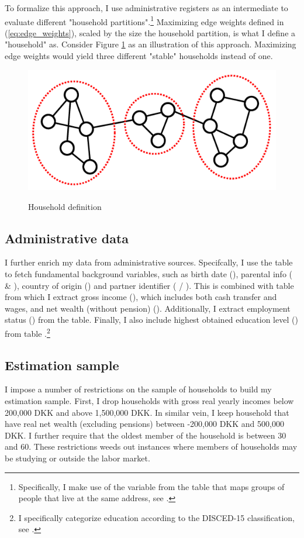 \documentclass[main.tex]{subfiles}
\begin{document}
To formalize this approach, I use administrative registers as an intermediate to evaluate different "household partitions".\footnote{Specifically, I make use of the  variable from the  table that maps groups of people that live at the same address, see \textcite{dst_familie_id}.} Maximizing edge weights defined in (\ref{eq:edge_weights}), scaled by the size the household partition, is what I define a "household" as. Consider Figure \ref{fig:temporal_community_detection} as an illustration of this approach. Maximizing edge weights would yield three different "stable" households instead of one.
\begin{figure}[H]
    \centering
    \caption{Household definition}
    \includegraphics[width=0.4\linewidth]{figs/temporal_community_detection.png}
    \label{fig:temporal_community_detection}
\end{figure}

\subsection{Administrative data}
I further enrich my data from administrative sources. Specifcally, I use the table  to fetch fundamental background variables, such as birth date (), parental info ( \& ), country of origin () and partner identifier ( / ). This is combined with table  from which I extract gross income (), which includes both cash transfer and wages, and net wealth (without pension) (\textcolor{red}{}). Additionally, I extract employment status () from the  table. Finally, I also include highest obtained education level () from table .\footnote{I specifically categorize education according to the DISCED-15 classification, see \textcite{dst_disced_edu}.}

\subsection{Estimation sample}
\label{sec:estimation_sample_definition}
I impose a number of restrictions on the sample of households to build my estimation sample. First, I drop households with gross real yearly incomes below 200,000 DKK and above 1,500,000 DKK. In similar vein, I keep household that have real net wealth (excluding pensions) between -200,000 DKK and 500,000 DKK. I further require that the oldest member of the household is between 30 and 60. These restrictions weeds out instances where members of households may be studying or outside the labor market.  
\end{document}
